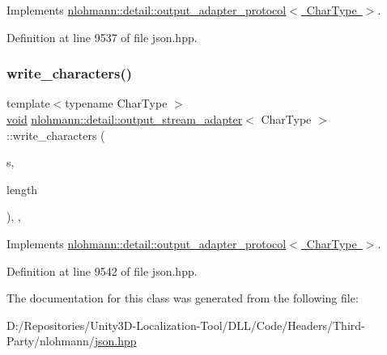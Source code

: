 Implements \mbox{\hyperlink{structnlohmann_1_1detail_1_1output__adapter__protocol_a3381896fe1be557f591de2e917cdc7d5}{nlohmann\+::detail\+::output\+\_\+adapter\+\_\+protocol$<$ Char\+Type $>$}}.



Definition at line 9537 of file json.\+hpp.

\mbox{\label{classnlohmann_1_1detail_1_1output__stream__adapter_ad61375497a7d03cb0bdcddfdaad185d0}} 
\subsubsection{\texorpdfstring{write\_characters()}{write\_characters()}}
{\footnotesize\ttfamily template$<$typename Char\+Type $>$ \\
\mbox{\hyperlink{namespacenlohmann_1_1detail_a59fca69799f6b9e366710cb9043aa77d}{void}} \mbox{\hyperlink{classnlohmann_1_1detail_1_1output__stream__adapter}{nlohmann\+::detail\+::output\+\_\+stream\+\_\+adapter}}$<$ Char\+Type $>$\+::write\+\_\+characters (\begin{DoxyParamCaption}\item[{const Char\+Type $\ast$}]{s,  }\item[{std\+::size\+\_\+t}]{length }\end{DoxyParamCaption})\hspace{0.3cm}{\ttfamily [inline]}, {\ttfamily [override]}, {\ttfamily [virtual]}}



Implements \mbox{\hyperlink{structnlohmann_1_1detail_1_1output__adapter__protocol_a2f410a164e0eda17cf6561114b0eee4a}{nlohmann\+::detail\+::output\+\_\+adapter\+\_\+protocol$<$ Char\+Type $>$}}.



Definition at line 9542 of file json.\+hpp.



The documentation for this class was generated from the following file\+:\begin{DoxyCompactItemize}
\item 
D\+:/\+Repositories/\+Unity3\+D-\/\+Localization-\/\+Tool/\+D\+L\+L/\+Code/\+Headers/\+Third-\/\+Party/nlohmann/\mbox{\hyperlink{json_8hpp}{json.\+hpp}}\end{DoxyCompactItemize}
